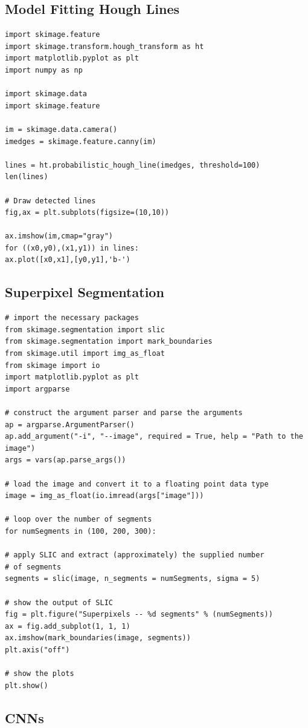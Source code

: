 \subsection{Model Fitting Hough Lines}
\begin{verbatim}
import skimage.feature
import skimage.transform.hough_transform as ht
import matplotlib.pyplot as plt
import numpy as np

import skimage.data
import skimage.feature

im = skimage.data.camera()
imedges = skimage.feature.canny(im)

lines = ht.probabilistic_hough_line(imedges, threshold=100)
len(lines)

# Draw detected lines
fig,ax = plt.subplots(figsize=(10,10))

ax.imshow(im,cmap="gray")
for ((x0,y0),(x1,y1)) in lines:
ax.plot([x0,x1],[y0,y1],'b-')
\end{verbatim}


\subsection{Superpixel Segmentation}
\begin{verbatim}
# import the necessary packages
from skimage.segmentation import slic
from skimage.segmentation import mark_boundaries
from skimage.util import img_as_float
from skimage import io
import matplotlib.pyplot as plt
import argparse

# construct the argument parser and parse the arguments
ap = argparse.ArgumentParser()
ap.add_argument("-i", "--image", required = True, help = "Path to the image")
args = vars(ap.parse_args())

# load the image and convert it to a floating point data type
image = img_as_float(io.imread(args["image"]))

# loop over the number of segments
for numSegments in (100, 200, 300):

# apply SLIC and extract (approximately) the supplied number
# of segments
segments = slic(image, n_segments = numSegments, sigma = 5)

# show the output of SLIC
fig = plt.figure("Superpixels -- %d segments" % (numSegments))
ax = fig.add_subplot(1, 1, 1)
ax.imshow(mark_boundaries(image, segments))
plt.axis("off")

# show the plots
plt.show()
\end{verbatim}


\subsection{CNNs}

